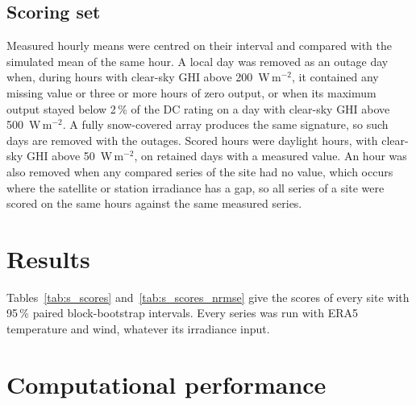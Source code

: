 \documentclass[11pt]{article}
\begin{document}
\subsection{Scoring set}
\label{sec:s_scoring}

Measured hourly means were centred on their interval and compared with the simulated mean of the same hour. A local day was removed as an outage day when, during hours with clear-sky GHI above 200~W\,m$^{-2}$, it contained any missing value or three or more hours of zero output, or when its maximum output stayed below 2\,\% of the DC rating on a day with clear-sky GHI above 500~W\,m$^{-2}$. A fully snow-covered array produces the same signature, so such days are removed with the outages. Scored hours were daylight hours, with clear-sky GHI above 50~W\,m$^{-2}$, on retained days with a measured value. An hour was also removed when any compared series of the site had no value, which occurs where the satellite or station irradiance has a gap, so all series of a site were scored on the same hours against the same measured series.



\section{Results}
\label{sec:s_results}

Tables~\ref{tab:s_scores} and~\ref{tab:s_scores_nrmse} give the scores of every site with 95\,\% paired block-bootstrap intervals. Every series was run with ERA5 temperature and wind, whatever its irradiance input.



\section{Computational performance}
\label{sec:s_bench}
\end{document}
